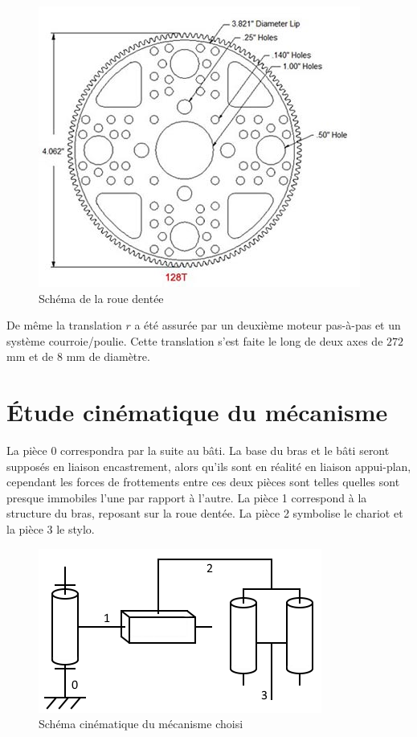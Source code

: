 \documentclass[12pt,a4paper]{report}
\begin{document}
\begin{figure}[!h]
 \center
 \includegraphics[scale=0.5]{../pictures/rouedentee2.jpg}
 \caption{Schéma de la roue dentée}
\end{figure}


De même la translation $r$ a été assurée par un deuxième moteur pas-à-pas et un système courroie/poulie. Cette translation s'est faite le long de deux axes de $272$ mm et de $8$ mm de diamètre.

	\section{Étude cinématique du mécanisme}
	La pièce 0 correspondra par la suite au bâti. La base du bras et le bâti seront supposés en liaison encastrement, alors qu'ils sont en réalité en liaison appui-plan, cependant les forces de frottements entre ces deux pièces sont telles quelles sont presque immobiles l'une par rapport à l'autre. La pièce 1 correspond à la structure du bras, reposant sur la roue dentée. La pièce 2 symbolise le chariot et la pièce 3 le stylo.

\begin{figure}[!h]
 \center
 \includegraphics[scale=1.1]{../pictures/schema_cinematique.png}
 \caption{Schéma cinématique du mécanisme choisi}
\end{figure}
\end{document}
